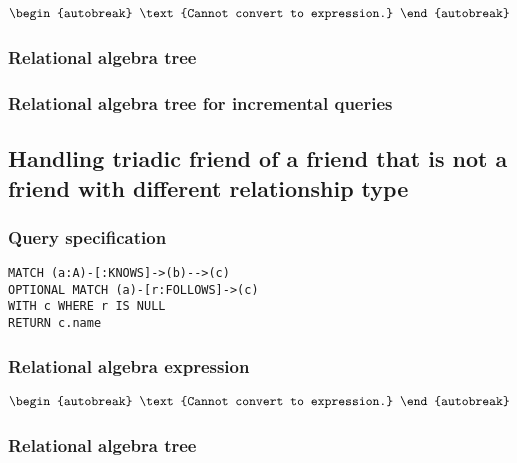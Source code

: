 \begin{align*}
\begin{autobreak}
\text{Cannot convert to expression.}
\end{autobreak}
\end{align*}

\subsubsection*{Relational algebra tree}


\subsubsection*{Relational algebra tree for incremental queries}


\subsection{Handling triadic friend of a friend that is not a friend with different relationship type}

\subsubsection*{Query specification}

\begin{lstlisting}
MATCH (a:A)-[:KNOWS]->(b)-->(c)
OPTIONAL MATCH (a)-[r:FOLLOWS]->(c)
WITH c WHERE r IS NULL
RETURN c.name
\end{lstlisting}

\subsubsection*{Relational algebra expression}

\begin{align*}
\begin{autobreak}
\text{Cannot convert to expression.}
\end{autobreak}
\end{align*}

\subsubsection*{Relational algebra tree}

